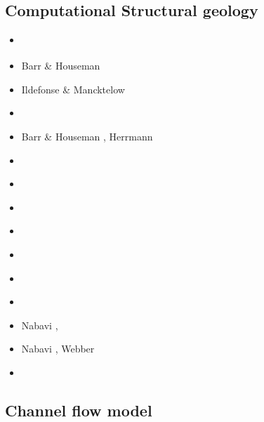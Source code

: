 \subsection{Computational Structural geology}

\begin{scriptsize}
\begin{itemize}
\item[\nineteenseventyone] \cite{stbe71}
\item[\nineteenninetytwo] Barr \& Houseman \cite{baho92}
\item[\nineteenninetythree] Ildefonse \& Mancktelow \cite{ilma93}
\item[\nineteenninetyfive] \cite{fige95}
\item[\nineteenninetysix] Barr \& Houseman \cite{baho96}, Herrmann \etal \cite{hept96}
\item[\twothousand] \cite{acgf00}\cite{trla00}
\item[\twothousandone] \cite{masc01}
\item[\twothousandeight] \cite{manc08}\cite{scsf08}
\item[\twothousandeleven] \cite{frem11}
\item[\twothousandthirteen] \cite{soma13}\cite{lehl13}
\item[\twothousandfourteen] \cite{olbm14}
\item[\twothousandfifteen] \cite{pevp15}\cite{jalr15}
\item[\twothousandseventeen] Nabavi \etal \cite{naam17}, \cite{scdu17}
\item[\twothousandeighteen] Nabavi \etal \cite{naam18}, Webber \etal \cite{weef18}
\item[\twothousandnineteen] \cite{llor19}\cite{yada19}\cite{sogh19}
\end{itemize}
\end{scriptsize}

\subsection{Channel flow model} 

